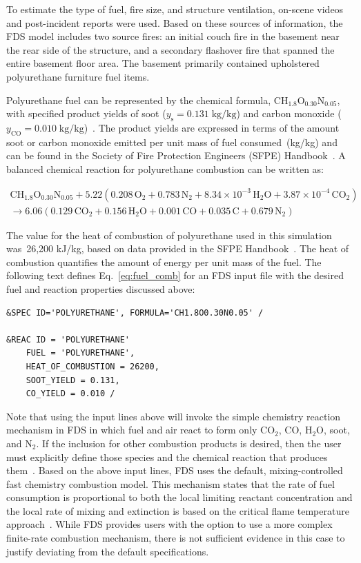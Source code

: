 \documentclass[12pt,oneside]{book}
\renewcommand{\C}{\mbox{C}}
\renewcommand{\H}{\mbox{H}}
\renewcommand{\O}{\mbox{O}}
\newcommand{\N}{\mbox{N}}
\begin{document}
To estimate the type of fuel, fire size, and structure ventilation, on-scene videos and post-incident reports were used. Based on these sources of information, the FDS model includes two source fires: an initial couch fire in the basement near the rear side of the structure, and a secondary flashover fire that spanned the entire basement floor area. The basement primarily contained upholstered polyurethane furniture fuel items.

Polyurethane fuel can be represented by the chemical formula, $\C\H_{1.8}\O_{0.30}\N_{0.05}$, with specified product yields of soot ($y_{\mathrm{s}}=0.131 \; \mathrm{kg}/\mathrm{kg}$) and carbon monoxide ($y_{\mathrm{CO}}=0.010 \; \mathrm{kg}/\mathrm{kg}$)~\cite{SFPE:Tewarson}. The product yields are expressed in terms of the amount soot or carbon monoxide emitted per unit mass of fuel consumed~(kg/kg) and can be found in the Society of Fire Protection Engineers (SFPE) Handbook~\cite{SFPE:Tewarson}. A balanced chemical reaction for polyurethane combustion can be written as:

\begin{multline}
\C\H_{1.8}\O_{0.30}\N_{0.05} + 5.22(0.208\,\O_{2} + 0.783\,\N_{2} + 8.34 \times 10^{-3}\,\H_{2}\O + 3.87 \times 10^{-4}\,\C\O_{2}) \\
\rightarrow 6.06(0.129\,\C\O_{2} + 0.156\,\H_{2}\O + 0.001\,\C\O + 0.035\,\C + 0.679\,\N_{2})
\label{eq:fuel_comb}
\end{multline}

The value for the heat of combustion of polyurethane used in this simulation was~26,200 kJ/kg, based on data provided in the SFPE Handbook~\cite{SFPE:Tewarson}. The heat of combustion quantifies the amount of energy per unit mass of the fuel. The following text defines Eq.~\ref{eq:fuel_comb} for an FDS input file with the desired fuel and reaction properties discussed above:

\begin{lstlisting}
&SPEC ID='POLYURETHANE', FORMULA='CH1.8O0.30N0.05' /

&REAC ID = 'POLYURETHANE' 
    FUEL = 'POLYURETHANE', 
    HEAT_OF_COMBUSTION = 26200,
    SOOT_YIELD = 0.131,
    CO_YIELD = 0.010 /
\end{lstlisting}

Note that using the input lines above will invoke the simple chemistry reaction mechanism in FDS in which fuel and air react to form only CO$_2$, CO, H$_2$O, soot, and N$_2$. If the inclusion for other combustion products is desired, then the user must explicitly define those species and the chemical reaction that produces them~\cite{FDS_Users_Guide}. Based on the above input lines, FDS uses the default, mixing-controlled fast chemistry combustion model. This mechanism states that the rate of fuel consumption is proportional to both the local limiting reactant concentration and the local rate of mixing and extinction is based on the critical flame temperature approach~\cite{FDS_Math_Guide}. While FDS provides users with the option to use a more complex finite-rate combustion mechanism, there is not sufficient evidence in this case to justify deviating from the default specifications. 
\end{document}
